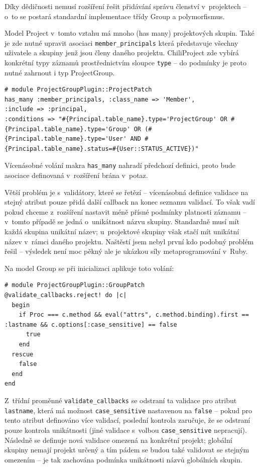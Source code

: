 \documentclass[thesis=B,czech]{FITthesis}[2012/05/02]
\begin{document}
Díky dědičnosti nemusí rozšíření řešit přidávání správu členství
v~projektech -- o~to se postará standardní implementace třídy Group a
polymorfismus.

Model Project v~tomto vztahu má mnoho (has many) projektových skupin.
Také je zde nutné upravit asociaci \lstinline!member_principals! která
představuje všechny uživatele a skupiny jenž jsou členy daného projektu.
ChiliProject zde vybírá konkrétní typy záznamů prostřednictvím sloupce
\lstinline!type! -- do podmínky je proto nutné zahrnout i typ
ProjectGroup.

\begin{lstlisting}
# module ProjectGroupPlugin::ProjectPatch
has_many :member_principals, :class_name => 'Member',
:include => :principal,
:conditions => "#{Principal.table_name}.type='ProjectGroup' OR #{Principal.table_name}.type='Group' OR (#{Principal.table_name}.type='User' AND #{Principal.table_name}.status=#{User::STATUS_ACTIVE})"
\end{lstlisting}
Vícenásobné volání makra \lstinline!has_many! nahradí předchozí
definici, proto bude asociace definovaná v~rozšíření brána v~potaz.

Větší problém je s~validátory, které se řetězí -- vícenásobná definice
validace na stejný atribut pouze přidá další \gls{callback} na konec
seznamu validací. To však vadí pokud chceme z~rozšíření nastavit méně
přísné podmínky platnosti záznamu -- v~tomto případě se jedná
o~unikátnost názvu skupiny. Standardně musí mít každá skupina unikátní
název; u~projektové skupiny však stačí mít unikátní název v~rámci daného
projektu. Naštěstí jsem nebyl první kdo podobný problém řešil
\citep{McAlpin2011} -- výsledek není moc pěkný ale je ukázkou síly
metaprogramování v~Ruby.

Na model Group se při inicializaci aplikuje toto volání:

\begin{lstlisting}
# module ProjectGroupPlugin::GroupPatch
@validate_callbacks.reject! do |c|
  begin
    if Proc === c.method && eval("attrs", c.method.binding).first == :lastname && c.options[:case_sensitive] == false
      true
    end
  rescue
    false
  end
end
\end{lstlisting}
Z~třídní proměnné \lstinline!validate_callbacks! se odstraní ta validace
pro atribut \lstinline!lastname!, která má možnost
\lstinline!case_sensitive! nastavenou na \lstinline!false! -- pokud pro
tento atribut definováno více validací, poslední kontrola zaručuje, že
se odstraní pouze kontrola unikátnosti (jiné validace s~volbou
\lstinline!case_sensitive! nepracují). Následně se definuje nová
validace omezená na konkrétní projekt; globální skupiny nemají projekt
určený a tím pádem se budou také validovat se stejným omezením -- je tak
zachována podmínka unikátnosti názvů globálních skupin.
\end{document}
